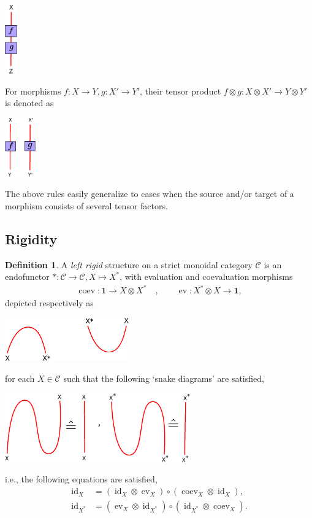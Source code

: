 \documentclass[a4paper, 10pt]{book}
\theoremstyle{definition}
\newtheorem{Def}[theorem]{Definition}
\numberwithin{equation}{chapter}
\newcommand\id{\operatorname{id}}
\newcommand\ot{\otimes}
\newcommand\C{\mathcal C}
\newcommand{\ra}\rightarrow
\newcommand\one{\mathbf{1}}
\newcommand\ev{\operatorname{ev}}
\newcommand\coev{\operatorname{coev}}
\begin{document}
\begin{center}
\includegraphics[width=0.04\textwidth]{morphism.eps}
\end{center}

For morphisms $f:X\ra Y, g:X'\ra Y'$, their tensor product $f\ot g: X\ot X' \ra Y \ot Y'$ is denoted as
\begin{center}
\includegraphics[width=0.1\textwidth]{tensor.eps}
\end{center}
The above rules easily generalize to cases when the source and/or target of a morphism consists of several tensor factors.
\subsection{Rigidity}
\begin{Def}
 A \textit{left rigid} structure on a strict monoidal category $\C$ is an endofunctor $*:\C \rightarrow \C, X\mapsto X^*$, with evaluation and coevaluation morphisms \begin{align}
	\coev: \one \rightarrow X\otimes X^*\quad, \quad \quad \ev:X^*\otimes X \rightarrow \one  
	,
\end{align}
depicted respectively as 
\begin{center}
\includegraphics[width=0.4\textwidth]{duals.eps}
\end{center}
for each $X \in \C$ such that the following `snake diagrams' are satisfied,

\begin{center}
\includegraphics[width=0.6\textwidth]{snake.eps}
\end{center}
i.e., the following equations are satisfied, \begin{align}
	\label{rigid2}\id_X &= (\id_X \otimes \ev_X) \circ(\coev_{X} \otimes \id_X),\\ \label{rigid1}\id_{X^*} &= (\ev_X\otimes \id_{X^*})\circ(\id_{X^*}\otimes \coev_X).
\end{align}

\end{Def}
\end{document}
